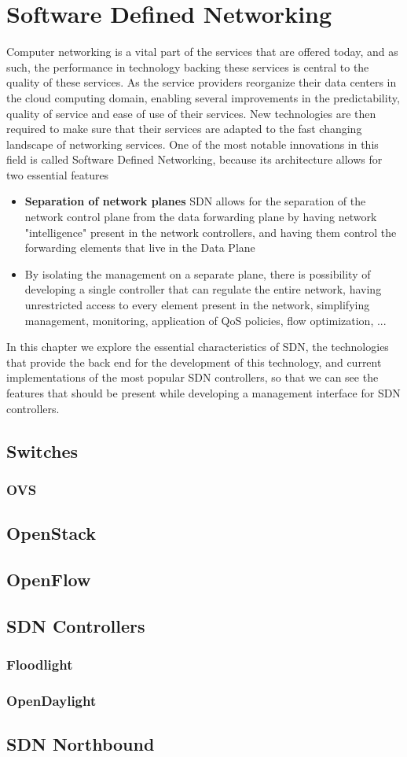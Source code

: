 \chapter{Software Defined Networking} \label{chap:sdn} %

Computer networking is a vital part of the services that are offered today, and as such, the performance in technology backing these services is central to the quality of these services. As the service providers reorganize their
data centers in the cloud computing domain, enabling several improvements in the predictability, quality of service and ease of use of their services. New technologies are then required to make sure that their services are adapted
to the fast changing landscape of networking services. One of the most notable innovations in this field is called Software Defined Networking, because its architecture allows for two essential features

\begin {itemize}
    \item \textbf{Separation of network planes} SDN allows for the separation of the network control plane from the data forwarding plane by having network "intelligence" present in the network controllers, and having them
control the forwarding elements that live in the Data Plane
    \item {} By isolating the management on a separate plane, there is possibility of developing a single controller that can regulate the entire network, having unrestricted access to every element present in the network, simplifying management, monitoring, application of QoS policies, flow optimization, ...
\end {itemize}

In this chapter we explore the essential characteristics of SDN, the technologies that provide the back end for the development of this technology, and current implementations of the most popular SDN controllers, so that we can 
see the features that should be present while developing a management interface for SDN controllers.

\section {Switches}
\subsection {OVS}
\section {OpenStack}
\section {OpenFlow}
\section {SDN Controllers}
\subsection {Floodlight}
\subsection {OpenDaylight}
\section {SDN Northbound}
